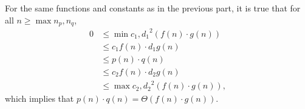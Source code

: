 For the same functions and constants as in the previous part, it is true that for all $n\ge\max{n_p,n_q}$,
\begin{align*}
    0 &\le \min{c_1,d_1}^2(f(n)\cdot g(n)) \\
    &\le c_1f(n)\cdot d_1g(n) \\
    &\le p(n)\cdot q(n) \\
    &\le c_2f(n)\cdot d_2g(n) \\
    &\le \max{c_2,d_2}^2(f(n)\cdot g(n)),
\end{align*}
which implies that $p(n)\cdot q(n)=\Theta(f(n)\cdot g(n))$.
